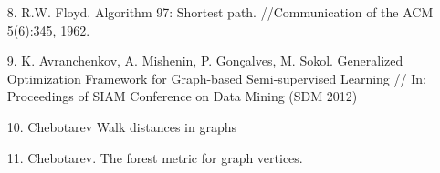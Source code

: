 \begin{itemize}
\item[8.] R.W. Floyd. Algorithm 97: Shortest path. //Communication of the ACM 5(6):345, 1962.

\item[9.] K. Avranchenkov, A. Mishenin, P. Gonçalves, M. Sokol. Generalized Optimization Framework for Graph-based Semi-supervised Learning // In: Proceedings of SIAM Conference on Data Mining (SDM 2012)

\item[10.] Chebotarev Walk distances in graphs

\item[11.] Chebotarev. The forest metric for graph vertices.

\end{itemize}